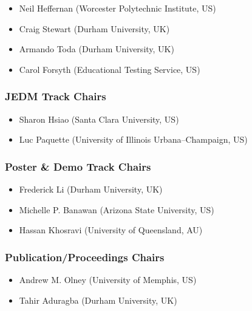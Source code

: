 \documentclass[letterpaper,11pt,oneside]{book} %
\providecommand{\tightlist}{%
  \setlength{\itemsep}{0pt}\setlength{\parskip}{0pt}}
\begin{document}
\begin{itemize}
\tightlist
\item
  Neil Heffernan (Worcester Polytechnic Institute, US)
\item
  Craig Stewart (Durham University, UK)
\item
  Armando Toda (Durham University, UK)
\item
  Carol Forsyth (Educational Testing Service, US)
\end{itemize}

\subsubsection{JEDM Track Chairs}%

\begin{itemize}
\tightlist
\item
  Sharon Hsiao (Santa Clara University, US)
\item
  Luc Paquette (University of Illinois Urbana--Champaign, US)
\end{itemize}

\subsubsection{Poster \& Demo Track
Chairs}%

\begin{itemize}
\tightlist
\item
  Frederick Li (Durham University, UK)
\item
  Michelle P. Banawan (Arizona State University, US)
\item
  Hassan Khosravi (University of Queensland, AU)
\end{itemize}

\subsubsection{Publication/Proceedings
Chairs}%

\begin{itemize}
\tightlist
\item
  Andrew M. Olney (University of Memphis, US)
\item
  Tahir Aduragba (Durham University, UK)
\end{itemize}
\end{document}
